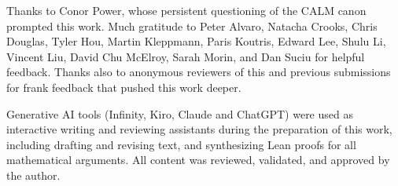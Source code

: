 \documentclass[sigconf]{cidr-2027}
\theoremstyle{remark}
\begin{document}
\begin{acks}
\textcolor{reviewed}{Thanks to Conor Power, whose persistent questioning of the CALM canon prompted this work.} \textcolor{reviewed}{Much gratitude to Peter Alvaro, Natacha Crooks, Chris Douglas, Tyler Hou, Martin
Kleppmann, Paris Koutris, Edward Lee, Shulu Li, Vincent Liu, David Chu McElroy,
Sarah Morin, and Dan Suciu for helpful feedback.} \textcolor{reviewed}{Thanks also to
anonymous reviewers of this and previous submissions for frank feedback that pushed
this work deeper.}

\textcolor{reviewed}{Generative AI tools (Infinity, Kiro, Claude and ChatGPT) were used as interactive writing and
reviewing assistants during the preparation of this work, including drafting
and revising text, and synthesizing Lean proofs for all mathematical arguments.} \textcolor{reviewed}{All
content was reviewed, validated, and approved by the author.}
\end{acks}





\end{document}

